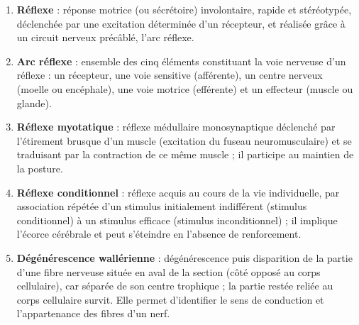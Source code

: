\documentclass[11pt]{article}
\newcommand{\cle}[1]{{\popxbold\color{popdark}#1}}
\begin{document}
\begin{corrige}
\begin{enumerate}
\item \textbf{Réflexe} : réponse motrice (ou sécrétoire) \cle{involontaire}, rapide et stéréotypée, déclenchée par une excitation déterminée d'un récepteur, et réalisée grâce à un circuit nerveux précâblé, l'arc réflexe.
\item \textbf{Arc réflexe} : ensemble des cinq éléments constituant la voie nerveuse d'un réflexe : un \cle{récepteur}, une voie sensitive (afférente), un \cle{centre nerveux} (moelle ou encéphale), une voie motrice (efférente) et un \cle{effecteur} (muscle ou glande).
\item \textbf{Réflexe myotatique} : réflexe médullaire \cle{monosynaptique} déclenché par l'étirement brusque d'un muscle (excitation du fuseau neuromusculaire) et se traduisant par la contraction de ce même muscle ; il participe au maintien de la posture.
\item \textbf{Réflexe conditionnel} : réflexe \cle{acquis} au cours de la vie individuelle, par association répétée d'un stimulus initialement indifférent (stimulus conditionnel) à un stimulus efficace (stimulus inconditionnel) ; il implique l'écorce cérébrale et peut s'éteindre en l'absence de renforcement.
\item \textbf{Dégénérescence wallérienne} : dégénérescence puis disparition de la partie d'une fibre nerveuse située \cle{en aval de la section} (côté opposé au corps cellulaire), car séparée de son centre trophique ; la partie restée reliée au corps cellulaire survit. Elle permet d'identifier le sens de conduction et l'appartenance des fibres d'un nerf.
\end{enumerate}
\end{corrige}
\end{document}
